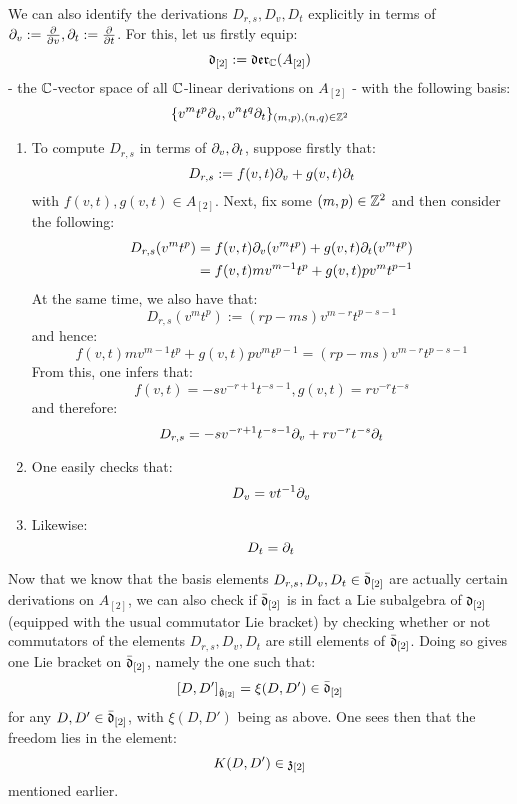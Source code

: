 \begin{remark}
                We can also identify the derivations $D_{r, s}, D_v, D_t$ explicitly in terms of $\partial_v := \frac{\partial}{\partial v}, \partial_t := \frac{\partial}{\partial t}$. For this, let us firstly equip:
                    $$\mathfrak{d}_{[2]} := \mathfrak{der}_{\mathbb{C}}(A_{[2]})$$
                - the $\mathbb{C}$-vector space of all $\mathbb{C}$-linear derivations on $A_{[2]}$ - with the following basis:
                    $$\{ v^m t^p \partial_v, v^n t^q \partial_t \}_{(m, p), (n, q) \in \mathbb{Z}^2}$$
                \begin{enumerate}
                    \item To compute $D_{r, s}$ in terms of $\partial_v, \partial_t$, suppose firstly that:
                        $$D_{r, s} := f(v, t) \partial_v + g(v, t) \partial_t$$
                    with $f(v, t), g(v, t) \in A_{[2]}$. Next, fix some $(m, p) \in \mathbb{Z}^2$ and then consider the following:
                        $$
                            \begin{aligned}
                                D_{r, s}( v^m t^p ) & = f(v, t) \partial_v( v^m t^p ) + g(v, t) \partial_t( v^m t^p )
                                \\
                                & = f(v, t) m v^{m - 1} t^p + g(v, t) p v^m t^{p - 1}
                            \end{aligned}
                        $$
                    At the same time, we also have that:
                        $$D_{r, s}(v^m t^p) := ( rp - ms ) v^{m - r} t^{p - s - 1}$$
                    and hence:
                        $$f(v, t) m v^{m - 1} t^p + g(v, t) p v^m t^{p - 1} = ( rp - ms ) v^{m - r} t^{p - s - 1}$$
                    From this, one infers that:
                        $$f(v, t) = -s v^{-r + 1} t^{-s - 1}, g(v, t) = r v^{-r} t^{-s}$$
                    and therefore:
                        $$D_{r, s} = -s v^{-r + 1} t^{-s - 1} \partial_v + r v^{-r} t^{-s} \partial_t$$
                    \item One easily checks that:
                        $$D_v = v t^{-1} \partial_v$$
                    \item Likewise:
                        $$D_t = \partial_t$$
                \end{enumerate}

                Now that we know that the basis elements $D_{r, s}, D_v, D_t \in \bar{\mathfrak{d}}_{[2]}$ are actually certain derivations on $A_{[2]}$, we can also check if $\bar{\mathfrak{d}}_{[2]}$ is in fact a Lie subalgebra of $\mathfrak{d}_{[2]}$ (equipped with the usual commutator Lie bracket) by checking whether or not commutators of the elements $D_{r, s}, D_v, D_t$ are still elements of $\bar{\mathfrak{d}}_{[2]}$. Doing so gives one Lie bracket on $\bar{\mathfrak{d}}_{[2]}$, namely the one such that:
                    $$[D, D']_{\hat{\mathfrak{g}}_{[2]}} = \xi(D, D') \in \bar{\mathfrak{d}}_{[2]}$$
                for any $D, D' \in \bar{\mathfrak{d}}_{[2]}$, with $\xi(D, D')$ being as above. One sees then that the freedom lies in the element:
                    $$K(D, D') \in \mathfrak{z}_{[2]}$$
                mentioned earlier. 
            \end{remark}

